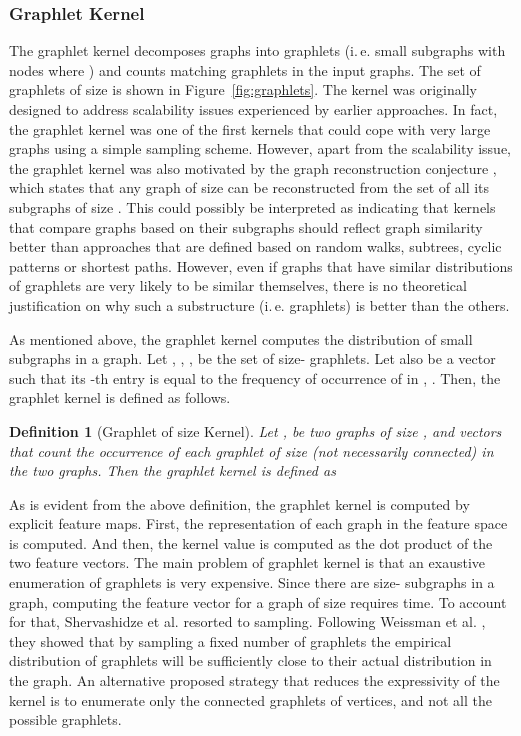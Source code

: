 \documentclass[twoside,11pt]{article}
\newcommand{\ie}{i.\,e. }
\newtheorem{definition}{Definition}
\begin{document}
\subsubsection{Graphlet Kernel}
The graphlet kernel decomposes graphs into graphlets (\ie small subgraphs with  nodes where ) \cite{prvzulj2007biological} and counts matching graphlets in the input graphs.
The set of graphlets of size  is shown in Figure~\ref{fig:graphlets}.
The kernel was originally designed to address scalability issues experienced by earlier approaches.
In fact, the graphlet kernel was one of the first kernels that could cope with very large graphs using a simple sampling scheme.
However, apart from the scalability issue, the graphlet kernel was also motivated by the graph reconstruction conjecture \cite{bondy1977graph}, which states that any graph of size  can be reconstructed from the set of all its subgraphs of size .
This could possibly be interpreted as indicating that kernels that compare graphs based on their subgraphs should reflect graph similarity better than approaches that are defined based on random walks, subtrees, cyclic patterns or shortest paths.
However, even if graphs that have similar distributions of graphlets are very likely to be similar themselves, there is no theoretical justification on why such a substructure (\ie graphlets) is better than the others.

As mentioned above, the graphlet kernel computes the distribution of small subgraphs in a graph.
Let , , ,  be the set of size- graphlets.
Let also  be a vector such that its -th entry is equal to the frequency of occurrence of  in , .
Then, the graphlet kernel is defined as follows.
\begin{definition}[Graphlet of size  Kernel]
  Let ,  be two graphs of size , and  vectors that count the occurrence of each graphlet of size  (not necessarily connected) in the two graphs. 
  Then the graphlet kernel is defined as
  
\end{definition}
As is evident from the above definition, the graphlet kernel is computed by explicit feature maps.
First, the representation of each graph in the feature space is computed.
And then, the kernel value is computed as the dot product of the two feature vectors.
The main problem of graphlet kernel is that an exaustive enumeration of graphlets is very expensive.
Since there are  size- subgraphs in a graph, computing the feature vector for a graph of size  requires  time.
To account for that, Shervashidze et al. \citeyear{shervashidze2009efficient} resorted to sampling. 
Following Weissman et al. \citeyear{weissman2003inequalities}, they showed that by sampling a fixed number of graphlets the empirical distribution of graphlets will be sufficiently close to their actual distribution in the graph.  
An alternative proposed strategy that reduces the expressivity of the kernel is to enumerate only the connected graphlets of  vertices, and not all the possible graphlets.
\end{document}
